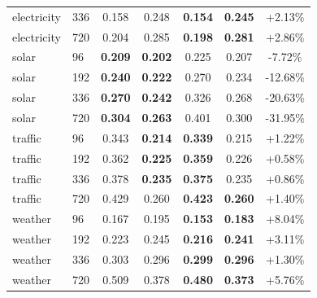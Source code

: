 \begin{table}[t]
\begin{tabular}{ll|cc|cc|c}
electricity & 336 & 0.158  & 0.248  &  \textbf{0.154} &  \textbf{0.245} & +2.13\% \\
electricity & 720 & 0.204  & 0.285  &  \textbf{0.198} &  \textbf{0.281} & +2.86\% \\
solar & 96 & \textbf{0.209}  & \textbf{0.202}  &  0.225 &  0.207 & -7.72\% \\
solar & 192 & \textbf{0.240}  & \textbf{0.222}  &  0.270 &  0.234 & -12.68\% \\
solar & 336 & \textbf{0.270}  & \textbf{0.242}  &  0.326 &  0.268 & -20.63\% \\
solar & 720 & \textbf{0.304}  & \textbf{0.263}  &  0.401 &  0.300 & -31.95\% \\
traffic & 96 & 0.343  & \textbf{0.214}  &  \textbf{0.339} &  0.215 & +1.22\% \\
traffic & 192 & 0.362  & \textbf{0.225}  &  \textbf{0.359} &  0.226 & +0.58\% \\
traffic & 336 & 0.378  & \textbf{0.235}  &  \textbf{0.375} &  0.235 & +0.86\% \\
traffic & 720 & 0.429  & 0.260  &  \textbf{0.423} &  \textbf{0.260} & +1.40\% \\
weather & 96 & 0.167  & 0.195  &  \textbf{0.153} &  \textbf{0.183} & +8.04\% \\
weather & 192 & 0.223  & 0.245  &  \textbf{0.216} &  \textbf{0.241} & +3.11\% \\
weather & 336 & 0.303  & 0.296  &  \textbf{0.299} &  \textbf{0.296} & +1.30\% \\
weather & 720 & 0.509  & 0.378  &  \textbf{0.480} &  \textbf{0.373} & +5.76\% \\
\bottomrule
\end{tabular}
\end{table}